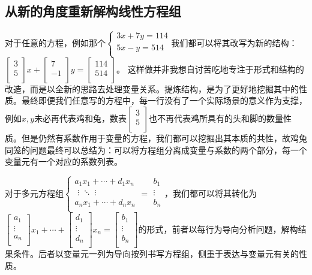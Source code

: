 \documentclass[fontset=none]{ctexart}
\begin{document}
\subsection{从新的角度重新解构线性方程组}
对于任意的方程，例如那个$
\begin{cases}
	3x+7y=114\\
	5x-y=514\\
\end{cases}
$我们都可以将其改写为新的结构：$\left[ \begin{array}{c}
	3\\
	5\\
\end{array} \right] x+\left[ \begin{array}{c}
	7\\
	-1\\
\end{array} \right] y=\left[ \begin{array}{c}
	114\\
	514\\
\end{array} \right] $。
这样做并非我想自讨苦吃地专注于形式和结构的改造，而是以全新的思路去处理变量关系。提炼结构，是为了更好地挖掘其中的性质。最终即便我们任意写的方程中，每一行没有了一个实际场景的意义作为支撑，例如$x,y$未必再代表鸡和兔，数表$\left[ \begin{array}{c}
	3\\
	5\\
\end{array} \right] $也不再代表鸡所具有的头和脚的数量性质。但是仍然有系数作用于变量的方程，我们都可以挖掘出其本质的共性，故鸡兔同笼的问题最终可以总结为：可以将方程组分离成变量与系数的两个部分，每一个变量元有一个对应的系数列表。

对于多元方程组$\begin{cases}
	a_1x_1+\cdots +d_1x_n\\
	\,\,\vdots \,\,   \ddots \,\,  \vdots\\
	a_nx_1+\cdots +d_nx_n\\
\end{cases}=\begin{array}{c}
	b_1\\
	\vdots\\
	b_n\\
\end{array}$，我们都可以将其转化为$\left[ \begin{array}{l}
	a_1\\
	\vdots\\
	a_n\\
\end{array} \right] x_1+\cdots +\left[ \begin{array}{l}
	d_1\\
	\vdots\\
	d_n\\
\end{array} \right] x_n=\left[ \begin{array}{c}
	b_1\\
	\vdots\\
	b_n\\
\end{array} \right] $的形式，前者以每行为导向分析问题，解构结果条件。后者以变量元一列为导向按列书写方程组，侧重于表达与变量元有关的性质。
\end{document}
